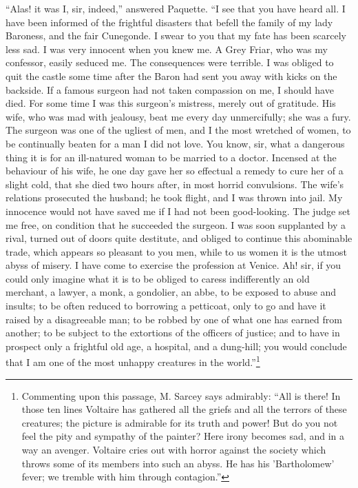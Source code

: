 ``Alas! it was I, sir, indeed,'' answered Paquette. ``I see that you have heard all. I have been informed of the frightful disasters that befell the family of my lady Baroness, and the fair Cunegonde. I swear to you that my fate has been scarcely less sad. I was very innocent when you knew me. A Grey Friar, who was my confessor, easily seduced me. The consequences were terrible. I was obliged to quit the castle some time after the Baron had sent you away with kicks on the backside. If a famous surgeon had not taken compassion on me, I should have died. For some time I was this surgeon's mistress, merely out of gratitude. His wife, who was mad with jealousy, beat me every day unmercifully; she was a fury. The surgeon was one of the ugliest of men, and I the most wretched of women, to be continually beaten for a man I did not love. You know, sir, what a dangerous thing it is for an ill-natured woman to be married to a doctor. Incensed at the behaviour of his wife, he one day gave her so effectual a remedy to cure her of a slight cold, that she died two hours after, in most horrid convulsions. The wife's relations prosecuted the husband; he took flight, and I was thrown into jail. My innocence would not have saved me if I had not been good-looking. The judge set me free, on condition that he succeeded the surgeon. I was soon supplanted by a rival, turned out of doors quite destitute, and obliged to continue this abominable trade, which appears so pleasant to you men, while to us women it is the utmost abyss of misery. I have come to exercise the profession at Venice. Ah! sir, if you could only imagine what it is to be obliged to caress indifferently an old merchant, a lawyer, a monk, a gondolier, an abbe, to be exposed to abuse and insults; to be often reduced to borrowing a petticoat, only to go and have it raised by a disagreeable man; to be robbed by one of what one has earned from another; to be subject to the extortions of the officers of justice; and to have in prospect only a frightful old age, a hospital, and a dung-hill; you would conclude that I am one of the most unhappy creatures in the world.''\footnote{Commenting upon this passage, M. Sarcey says admirably: ``All is there! In those ten lines Voltaire has gathered all the griefs and all the terrors of these creatures; the picture is admirable for its truth and power! But do you not feel the pity and sympathy of the painter? Here irony becomes sad, and in a way an avenger. Voltaire cries out with horror against the society which throws some of its members into such an abyss. He has his 'Bartholomew' fever; we tremble with him through contagion.''}

